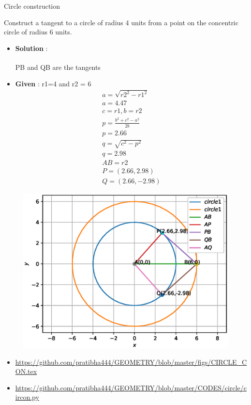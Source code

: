 \begin{frame}{Circle construction}

 Construct a tangent to a circle of radius 4 units
from a point on the concentric circle of radius
6 units.\\
\begin{itemize}
\item\textbf{Solution} :\\
\\  PB and QB are the tangents 
\end{itemize}
\seti
\end{frame}

\begin{frame}
\begin{itemize}
\item \textbf{Given} : r1=4 and r2 = 6\\
\begin{align*}
a=\sqrt{r2^2 - r1^2}\\
a=4.47\\
c=r1 , b=r2\\
p=\frac{b^2+c^2-a^2}{2b}\\
p=2.66\\
q=\sqrt{c^2 - p^2}\\
q=2.98\\
AB = r2 \\
P = (2.66,2.98)\\
Q = (2.66,-2.98)
\end{align*}
\end{itemize}

\end{frame}


\begin{frame}
\begin{figure}
\includegraphics[scale=.4]{./figs/CIR_CON.eps}
\end{figure}
\begin{itemize}
\item \url{https://github.com/pratibha444/GEOMETRY/blob/master/figs/CIRCLE_CON.tex}  \\
\item \url{https://github.com/pratibha444/GEOMETRY/blob/master/CODES/circle/circon.py}
\end{itemize}
\end{frame}